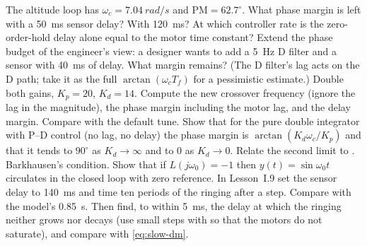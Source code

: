 \begin{exercises}
\exercise[1] The altitude loop has $\omega_c = \SI{7.04}{rad/s}$ and $\mathrm{PM} = 62.7^\circ$. What phase margin is left with a \SI{50}{ms} sensor delay? With \SI{120}{ms}?
\exercise[1] At which controller rate is the zero-order-hold delay alone equal to the motor time constant?
\exercise[1] Extend the phase budget of the engineer's view: a designer wants to add a \SI{5}{Hz} D filter and a sensor with \SI{40}{ms} of delay. What margin remains? (The D filter's lag acts on the D path; take it as the full $\arctan(\omega_cT_f)$ for a pessimistic estimate.)
\exercise[2] Double both gains, $K_p = 20$, $K_d = 14$. Compute the new crossover frequency (ignore the lag in the magnitude), the phase margin including the motor lag, and the delay margin. Compare with the default tune.
\exercise[2] Show that for the pure double integrator with P–D control (no lag, no delay) the phase margin is $\arctan(K_d\omega_c/K_p)$ and that it tends to $90^\circ$ as $K_d \to \infty$ and to $0$ as $K_d \to 0$. Relate the second limit to .
\exercise[2] Barkhausen's condition. Show that if $L(j\omega_0) = -1$ then $y(t) = \sin\omega_0 t$ circulates in the closed loop with zero reference.
\exercise[2] In Lesson~I.9 set the sensor delay to \SI{140}{ms} and time ten periods of the ringing after a step. Compare with the model's \SI{0.85}{s}. Then find, to within \SI{5}{ms}, the delay at which the ringing neither grows nor decays (use small steps with  so that the motors do not saturate), and compare with \cref{eq:slow-dm}.

\end{exercises}
